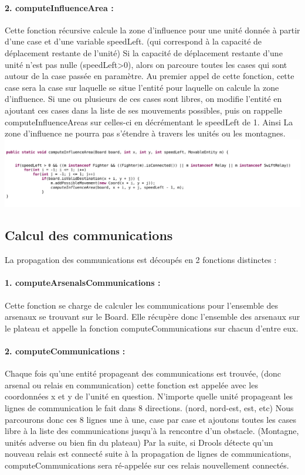 			\paragraph{2. computeInfluenceArea : }
			Cette fonction récursive calcule la zone d'influence pour une unité donnée à partir d'une case et d'une variable speedLeft. 
			(qui correspond à la capacité de déplacement restante de l'unité)
			Si la capacité de déplacement restante d'une unité n'est pas nulle (speedLeft\textgreater0), alors on parcoure toutes les cases 
			qui sont autour de la case passée en paramètre. 
			Au premier appel de cette fonction, cette case sera la case sur laquelle se situe l'entité pour laquelle on calcule la zone d'influence.
			Si une ou plusieurs de ces cases sont libres, on modifie l'entité en ajoutant ces cases dans la liste de ses mouvements possibles, 
			puis on rappelle computeInfluenceAreas sur celles-ci en décrémentant le speedLeft de 1.
			Ainsi La zone d'influence ne pourra pas s'étendre à travers les unités ou les montagnes.\\
			\includegraphics[scale=0.4]{images/implementation/computeInfluenceArea.png}
		
		\subsection{Calcul des communications}
		
			La propagation des communications est découpés en 2 fonctions distinctes :
			
			\paragraph{1. computeArsenalsCommunications : }
			Cette fonction se charge de calculer les communications pour l'ensemble des arsenaux se trouvant sur le Board.
			Elle récupère donc l'ensemble des arsenaux sur le plateau et appelle la fonction computeCommunications sur chacun d'entre eux.
			
			\paragraph{2. computeCommunications : }
			Chaque fois qu'une entité propageant des communications est trouvée, (donc arsenal ou relais en communication) cette fonction est appelée
			avec les coordonnées x et y de l'unité en question.
			N'importe quelle unité propageant les lignes de communication le fait dans 8 directions. (nord, nord-est, est, etc)
			Nous parcourons donc ces 8 lignes une à une, case par case et ajoutons toutes les cases libre à la liste des communications jusqu'à
			la rencontre d'un obstacle. (Montagne, unités adverse ou bien fin du plateau)
			Par la suite, si Drools détecte qu'un nouveau relais est connecté suite à la propagation de lignes de communications, computeCommunications
			sera ré-appelée sur ces relais nouvellement connectés.
		
